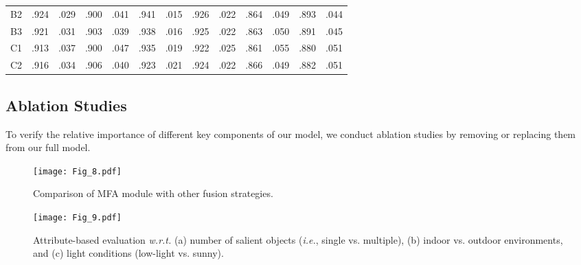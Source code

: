 \documentclass[10pt,twocolumn,letterpaper]{article}
\def\ie{\emph{i.e.}}
\begin{document}
\begin{table}[t!]
\begin{tabular}{c|cc|cc|cc|cc|cc|cc}
    B2
    & .924   & .029
    & .900   & .041
    & .941   & .015
    & .926   & .022
    & .864   & .049
    & .893   & .044 	\\

    B3
    & .921   & .031
    & .903   & .039
    & .938   & .016
    & .925   & .022
    & .863   & .050
    & .891   & .045 	\\

    \midrule

    C1
    & .913   & .037
    & .900   & .047
    & .935   & .019
    & .922   & .025
    & .861   & .055
    & .880   & .051 	\\

    C2
    & .916   & .034
    & .906   & .040
    & .923   & .021
    & .924   & .022
    & .866   & .049
    & .882   & .051 	\\


  \bottomrule
  \hline
  \end{tabular}\label{tab5}
\end{table}



\subsection{Ablation Studies}
\label{ablation}

To verify the relative importance of different key components of our model, we conduct ablation studies by removing or replacing them from our full model.



\begin{figure}
	\begin{centering}
		\texttt{[image: Fig\_8.pdf]}
		\caption{Comparison of MFA module with other fusion strategies.}\vspace{-0.4cm}
		\label{fig08}
	\end{centering}
\end{figure}



\begin{figure*}[!t]
	\begin{centering}
		\texttt{[image: Fig\_9.pdf]}\caption{Attribute-based evaluation \emph{w.r.t.} (a) number of salient objects (\ie, single vs. multiple), (b) indoor vs. outdoor environments, and (c) light conditions (low-light vs. sunny). }\vspace{-0.35cm}
		\label{fig09}
	\end{centering}
\end{figure*}
\end{document}

